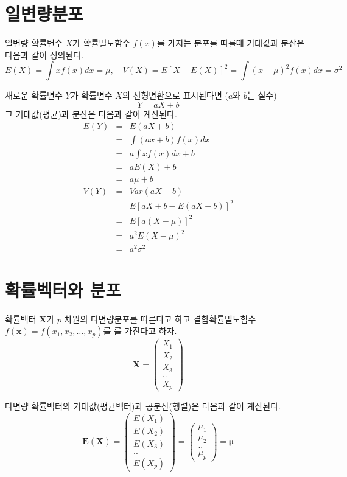 \documentclass[
]{book}
\theoremstyle{definition}
\theoremstyle{definition}
\theoremstyle{definition}
\theoremstyle{remark}
\begin{document}
\hypertarget{uxc77cuxbcc0uxb7c9uxbd84uxd3ec}{%
\section{일변량분포}\label{uxc77cuxbcc0uxb7c9uxbd84uxd3ec}}

일변량 확률변수 \(X\)가 확률밀도함수 \(f(x)\)를 가지는 분포를 따를때 기대값과 분산은 다음과 같이 정의된다.
\[ E(X) = \int x f(x)  dx = \mu, \quad V(X) = E[ X-E(X)]^2=\int (x-\mu)^2 f(x) dx =\sigma^2 \]

새로운 확률변수 \(Y\)가 확률변수 \(X\)의 선형변환으로 표시된다면 (\(a\)와 \(b\)는 실수)
\[ Y = aX+b\]
그 기대값(평균)과 분산은 다음과 같이 계산된다.
\begin{eqnarray*}
E(Y) &=& E(aX+b) \\
&=& \int (ax+b) f(x) dx \\
&=& a \int x f(x) dx + b \\
&=& a E(X) + b\\
&=& a \mu + b \\
V(Y) &=& Var(aX+b) \\
&=& E[aX+b -E(aX+b)]^2 \\
&=& E[a(X-\mu)]^2 \\
&=& a^2 E(X-\mu)^2\\
&=& a^2 \sigma^2
\end{eqnarray*}

\hypertarget{uxd655uxb960uxbca1uxd130uxc640-uxbd84uxd3ec}{%
\section{확률벡터와 분포}\label{uxd655uxb960uxbca1uxd130uxc640-uxbd84uxd3ec}}

확률벡터 \(\bm X\)가 \(p\) 차원의 다변량분포를 따른다고 하고 결합확률밀도함수 \(f(\bm x) =f(x_1,x_2,\dots,x_p)\)를
를 가진다고 하자.
\begin{equation*}
\bm X =
  \begin{pmatrix}
X_1 \\
X_2 \\
X_3 \\
..  \\
X_p
\end{pmatrix}
\end{equation*}

다변량 확률벡터의 기대값(평균벡터)과 공분산(행렬)은 다음과 같이 계산된다.
\begin{equation*}
\bm E(\bm X) =
  \begin{pmatrix}
E(X_1) \\
E(X_2) \\
E(X_3) \\
..  \\
E(X_p)
\end{pmatrix}
= 
  \begin{pmatrix}
\mu_1 \\
\mu_2 \\
..  \\
\mu_p
\end{pmatrix}
=\bm \mu
\end{equation*}
\end{document}
